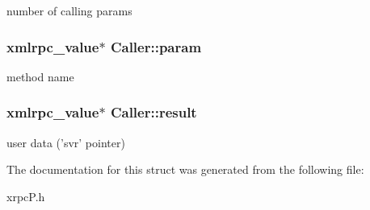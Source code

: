 number of calling params \hypertarget{structCaller_29d5894771b1992590480d27ceb401e5}{
\subsubsection[{param}]{\setlength{\rightskip}{0pt plus 5cm}xmlrpc\_\-value$\ast$ {\bf Caller::param}}}
\label{structCaller_29d5894771b1992590480d27ceb401e5}


method name \hypertarget{structCaller_96d6cfd2ecc822be1f59b80216def471}{
\subsubsection[{result}]{\setlength{\rightskip}{0pt plus 5cm}xmlrpc\_\-value$\ast$ {\bf Caller::result}}}
\label{structCaller_96d6cfd2ecc822be1f59b80216def471}


user data ('svr' pointer) 

The documentation for this struct was generated from the following file:\begin{CompactItemize}
\item 
xrpcP.h\end{CompactItemize}
